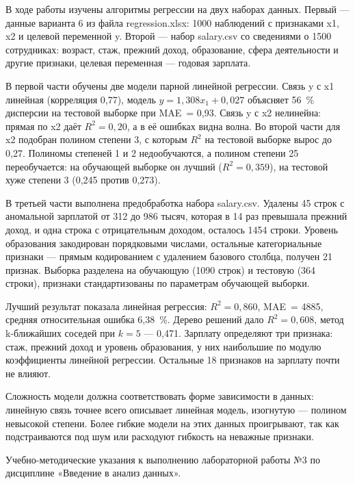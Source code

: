 \documentclass[a4paper,14pt]{extarticle}
\begin{document}
\suaiconclusion

В ходе работы изучены алгоритмы регрессии на двух наборах данных. Первый — данные варианта 6 из файла regression.xlsx: 1000 наблюдений с признаками x1, x2 и целевой переменной y. Второй — набор salary.csv со сведениями о 1500 сотрудниках: возраст, стаж, прежний доход, образование, сфера деятельности и другие признаки, целевая переменная — годовая зарплата.

В первой части обучены две модели парной линейной регрессии. Связь y с x1 линейная (корреляция 0,77), модель $y = 1{,}308 x_1 + 0{,}027$ объясняет 56~\% дисперсии на тестовой выборке при MAE~= 0,93. Связь y с x2 нелинейна: прямая по x2 даёт $R^2 = 0{,}20$, а в её ошибках видна волна. Во второй части для x2 подобран полином степени 3, с которым $R^2$ на тестовой выборке вырос до 0,27. Полиномы степеней 1 и 2 недообучаются, а полином степени 25 переобучается: на обучающей выборке он лучший ($R^2 = 0{,}359$), на тестовой хуже степени 3 (0,245 против 0,273).

В третьей части выполнена предобработка набора salary.csv. Удалены 45 строк с аномальной зарплатой от 312 до 986 тысяч, которая в 14 раз превышала прежний доход, и одна строка с отрицательным доходом, осталось 1454 строки. Уровень образования закодирован порядковыми числами, остальные категориальные признаки — прямым кодированием с удалением базового столбца, получен 21 признак. Выборка разделена на обучающую (1090 строк) и тестовую (364 строки), признаки стандартизованы по параметрам обучающей выборки.

Лучший результат показала линейная регрессия: $R^2 = 0{,}860$, MAE~= 4885, средняя относительная ошибка 6,38~\%. Дерево решений дало $R^2 = 0{,}608$, метод k-ближайших соседей при $k = 5$ — 0,471. Зарплату определяют три признака: стаж, прежний доход и уровень образования, у них наибольшие по модулю коэффициенты линейной регрессии. Остальные 18 признаков на зарплату почти не влияют.

Сложность модели должна соответствовать форме зависимости в данных: линейную связь точнее всего описывает линейная модель, изогнутую — полином невысокой степени. Более гибкие модели на этих данных проигрывают, так как подстраиваются под шум или расходуют гибкость на неважные признаки.

\suaisources
Учебно-методические указания к выполнению лабораторной работы №3 по дисциплине «Введение в анализ данных».
\end{document}
